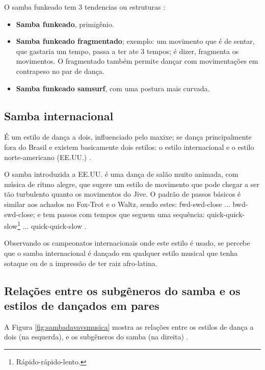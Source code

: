 O samba funkeado tem 3 tendencias ou estruturas  \cite{sambafunkeadoJimmyDeOliveiraPart2}:
\begin{itemize}
\item \textbf{Samba funkeado}, primigênio.
\item \textbf{Samba funkeado fragmentado}; exemplo: um movimento que é de sentar, que gastaria um tempo, 
passa a ter ate 3 tempos; é dizer, fragmenta os movimentos. 
O fragmentado também permite dançar com movimentações em contrapeso no par de dança.
\item \textbf{Samba funkeado samsurf}, com uma postura mais curvada.
\end{itemize}

 
\subsection{Samba internacional} 
É um estilo de dança a dois, influenciado pelo maxixe;
se dança principalmente fora do Brasil e existem basicamente dois estilos: 
o estilo internacional e o estilo norte-americano (EE.UU.) \cite[pp. 134-135]{perna2002samba}.

O samba introduzida a EE.UU. é uma dança de salão muito animada, 
com música de ritmo alegre, que sugere um estilo de movimento que pode
chegar a ser tão turbulento quanto os movimentos do Jive.
O padrão de passos básicos é similar aos achados no Fox-Trot e o Waltz,
sendo estes: fwd-swd-close ... bwd-swd-close; e
tem passos com tempos que seguem uma sequência: 
quick-quick-slow\footnote{Rápido-rápido-lento.} ... quick-quick-slow \cite{parson2016ballroom}.

Observando os campeonatos internacionais onde este estilo é usado, 
se percebe que o samba internacional é dançado em qualquer estilo musical que
tenha sotaque ou de a impressão de ter raiz afro-latina.

\subsection{Relações entre os subgêneros do samba e os estilos de dançados em pares}

A Figura \ref{fig:sambadavavsmusica} mostra as relações entre os estilos de dança a dois (na esquerda),
 e os subgêneros do samba (na direita) \cite[pp. 134-138]{perna2002samba}.

